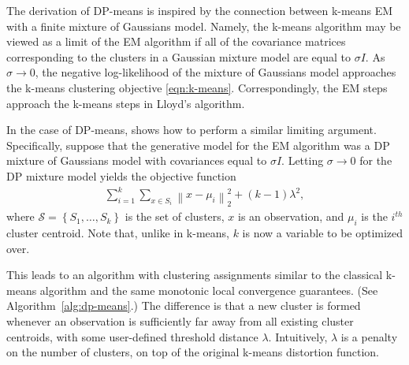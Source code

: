 \documentclass[letterpaper,10 pt,conference]{ieeeconf}
\begin{document}
The derivation of DP-means is inspired by the connection between k-means EM with a finite mixture of Gaussians model. Namely, the k-means algorithm may be viewed as a limit of the EM algorithm if all of the covariance matrices corresponding to the clusters in a Gaussian mixture model are equal to $\sigma I$. As $\sigma \rightarrow 0$, the negative log-likelihood of the mixture of Gaussians model approaches the k-means clustering objective \eqref{eqn:k-means}. Correspondingly, the EM steps approach the k-means steps in Lloyd's algorithm. 

In the case of DP-means, \cite{KJ:12} shows how to perform a similar limiting argument. Specifically, suppose that the generative model for the EM algorithm was a DP mixture of Gaussians model with covariances equal to $\sigma I$. Letting $\sigma \rightarrow 0$ for the DP mixture model yields the objective function
\begin{align}
  \sum_{i = 1}^{k}\sum_{x \in S_{i}} \left\| x - \mu_{i} \right\|_{2}^{2} + \left(k - 1\right)\lambda^{2},
  \label{eqn:dp-means}
\end{align}
where $\mathcal{S} = \left\{ S_{1},\ldots,S_{k} \right\}$ is the set of clusters, $x$ is an observation, and $\mu_{i}$ is the $i^{th}$ cluster centroid. Note that, unlike in k-means, $k$ is now a variable to be optimized over.

This leads to an algorithm with clustering assignments similar to the classical k-means algorithm and the same monotonic local convergence guarantees. (See Algorithm~\ref{alg:dp-means}.) The difference is that a new cluster is formed whenever an observation is sufficiently far away from all existing cluster centroids, with some user-defined threshold distance $\lambda$. Intuitively, $\lambda$ is a penalty on the number of clusters, on top of the original k-means distortion function. 
\end{document}
